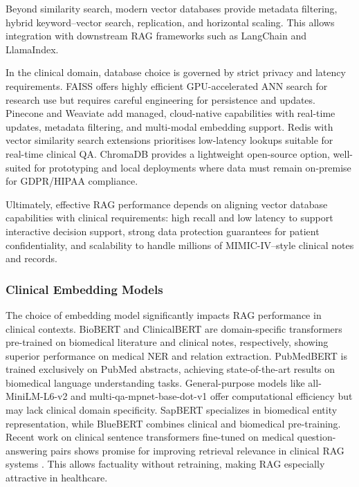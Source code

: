 Beyond similarity search, modern vector databases provide metadata filtering, hybrid keyword–vector search, replication, and horizontal scaling. This allows integration with downstream RAG frameworks such as LangChain and LlamaIndex. 

In the clinical domain, database choice is governed by strict privacy and latency requirements. FAISS offers highly efficient GPU-accelerated ANN search for research use but requires careful engineering for persistence and updates. Pinecone and Weaviate add managed, cloud-native capabilities with real-time updates, metadata filtering, and multi-modal embedding support. Redis with vector similarity search extensions prioritises low-latency lookups suitable for real-time clinical QA. ChromaDB provides a lightweight open-source option, well-suited for prototyping and local deployments where data must remain on-premise for GDPR/HIPAA compliance.

Ultimately, effective RAG performance depends on aligning vector database capabilities with clinical requirements: high recall and low latency to support interactive decision support, strong data protection guarantees for patient confidentiality, and scalability to handle millions of MIMIC-IV–style clinical notes and records.


\subsubsection{Clinical Embedding Models}
The choice of embedding model significantly impacts RAG performance in clinical contexts. BioBERT \citep{lee2020biobert} and ClinicalBERT \citep{alsentzer2019clinicalbert} are domain-specific transformers pre-trained on biomedical literature and clinical notes, respectively, showing superior performance on medical NER and relation extraction. PubMedBERT \citep{gu2021pubmedbert} is trained exclusively on PubMed abstracts, achieving state-of-the-art results on biomedical language understanding tasks. General-purpose models like all-MiniLM-L6-v2 and multi-qa-mpnet-base-dot-v1 \citep{reimers2019sentencebert} offer computational efficiency but may lack clinical domain specificity. SapBERT \citep{liu2021sapbert} specializes in biomedical entity representation, while BlueBERT \citep{peng2019bluebert} combines clinical and biomedical pre-training. Recent work on clinical sentence transformers fine-tuned on medical question-answering pairs shows promise for improving retrieval relevance in clinical RAG systems \citep{zhang2023clinical}.
This allows factuality without retraining, making RAG especially attractive in healthcare.

